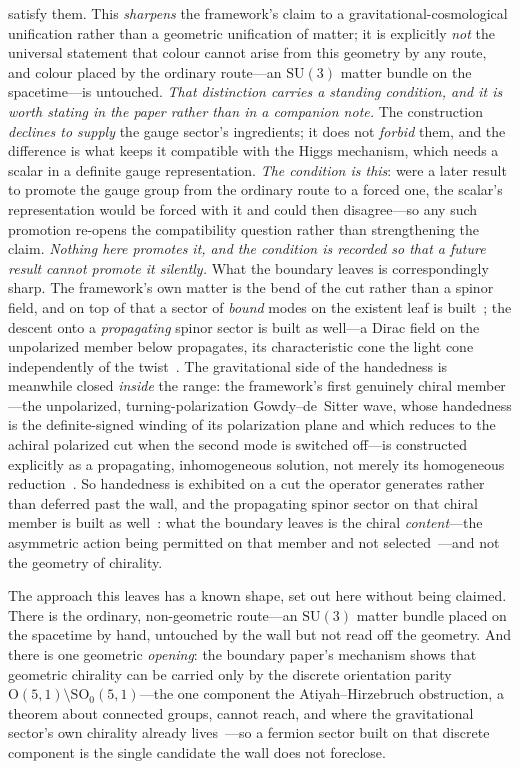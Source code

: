 \documentclass[11pt,a4paper]{article}
\theoremstyle{plain}
\theoremstyle{definition}
\theoremstyle{remark}
\begin{document}
\begin{enumerate}
satisfy them.  This \emph{sharpens} the framework's claim to a gravitational-cosmological unification rather than a geometric unification of matter; it is explicitly \emph{not} the universal statement that colour cannot arise from this geometry by any route, and colour placed by the ordinary route---an $\mathrm{SU}(3)$ matter bundle on the spacetime---is untouched. \emph{That distinction carries a standing condition, and it is worth stating in the paper rather than in a companion note.} The construction \emph{declines to supply} the gauge sector's ingredients; it does not \emph{forbid} them, and the difference is what keeps it compatible with the Higgs mechanism, which needs a scalar in a definite gauge representation. \emph{The condition is this}: were a later result to promote the gauge group from the ordinary route to a forced one, the scalar's representation would be forced with it and could then disagree---so any such promotion re-opens the compatibility question rather than strengthening the claim. \emph{Nothing here promotes it, and the condition is recorded so that a future result cannot promote it silently.} What the boundary leaves is correspondingly sharp. The framework's own matter is the bend of the cut rather than a spinor field, and on top of that a sector of \emph{bound} modes on the existent leaf is built~\cite{JanzenMatter}; the descent onto a \emph{propagating} spinor sector is built as well---a Dirac field on the unpolarized member below propagates, its characteristic cone the light cone independently of the twist~\cite{JanzenDynamics}. The gravitational side of the handedness is meanwhile closed \emph{inside} the range: the framework's first genuinely chiral member---the unpolarized, turning-polarization Gowdy--de~Sitter wave, whose handedness is the definite-signed winding of its polarization plane and which reduces to the achiral polarized cut when the second mode is switched off---is constructed explicitly as a propagating, inhomogeneous solution, not merely its homogeneous reduction~\cite{JanzenDynamics}. So handedness is exhibited on a cut the operator generates rather than deferred past the wall, and the propagating spinor sector on that chiral member is built as well~\cite{JanzenDynamics}: what the boundary leaves is the chiral \emph{content}---the asymmetric action being permitted on that member and not selected~\cite{JanzenMatter}---and not the geometry of chirality.

The approach this leaves has a known shape, set out here without being
claimed. There is the ordinary, non-geometric route---an $\mathrm{SU}(3)$ matter bundle placed on the spacetime by hand, untouched by the wall but not read off the geometry. And there is one geometric \emph{opening}: the boundary paper's mechanism shows that geometric chirality can be carried only by the discrete orientation parity $\mathrm{O}(5,1)\setminus\mathrm{SO}_0(5,1)$---the one component the Atiyah--Hirzebruch obstruction, a theorem about connected groups, cannot reach, and where the gravitational sector's own chirality already lives~\cite{JanzenBoundary,JanzenDynamics}---so a fermion sector built on that discrete component is the single candidate the wall does not foreclose.


\end{enumerate}
\end{document}
